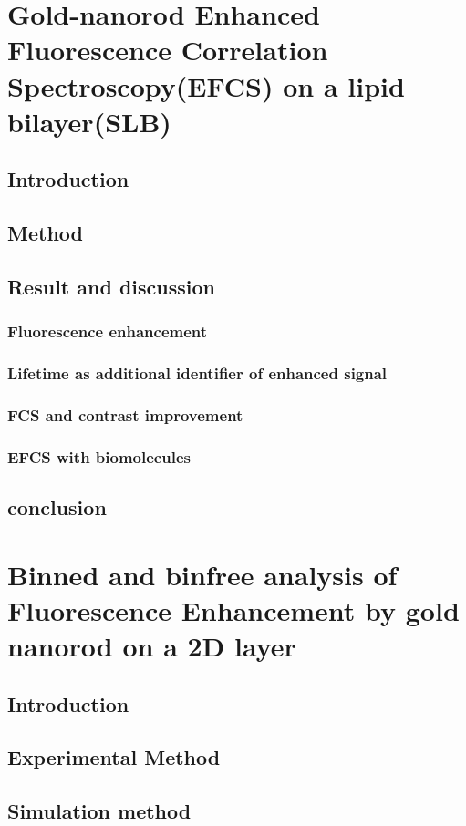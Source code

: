 \chapter{Gold-nanorod Enhanced Fluorescence Correlation Spectroscopy(EFCS) on a lipid bilayer(SLB)}
\section{Introduction}
\section{Method}
\section{Result and discussion}
\subsection{Fluorescence enhancement}
\subsection{Lifetime as additional identifier of enhanced signal}
\subsection{FCS and contrast improvement}
\subsection{EFCS with biomolecules}
\section{conclusion}


\chapter{Binned and binfree analysis of Fluorescence Enhancement by gold nanorod on a 2D layer}
\section{Introduction}
\section{Experimental Method}
\section{Simulation method}
